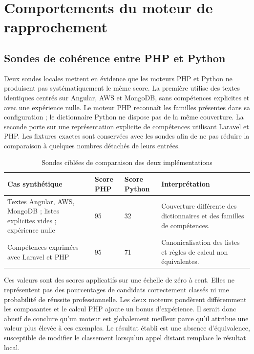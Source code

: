 \section{Comportements du moteur de rapprochement}

\subsection{Sondes de cohérence entre PHP et Python}

Deux sondes locales mettent en évidence que les moteurs PHP et Python ne produisent pas systématiquement le même score. La première utilise des textes identiques centrés sur Angular, AWS et MongoDB, sans compétences explicites et avec une expérience nulle. Le moteur PHP reconnaît les familles présentes dans sa configuration ; le dictionnaire Python ne dispose pas de la même couverture. La seconde porte sur une représentation explicite de compétences utilisant Laravel et PHP. Les fixtures exactes sont conservées avec les sondes afin de ne pas réduire la comparaison à quelques nombres détachés de leurs entrées.

\begin{table}[htbp]
\centering
\small
\caption{Sondes ciblées de comparaison des deux implémentations}
\label{tab:validation-scores}
\begin{tabularx}{\textwidth}{@{}Xp{}P{0.14\textwidth}P{0.25\textwidth}@{}}
\toprule
Cas synthétique & Score PHP & Score Python & Interprétation \\
\midrule
Textes Angular, AWS, MongoDB ; listes explicites vides ; expérience nulle & 95 & 32 & Couverture différente des dictionnaires et des familles de compétences. \\
Compétences exprimées avec Laravel et PHP & 95 & 71 & Canonicalisation des listes et règles de calcul non équivalentes. \\
\bottomrule
\end{tabularx}
\end{table}

Ces valeurs sont des scores applicatifs sur une échelle de zéro à cent. Elles ne représentent pas des pourcentages de candidats correctement classés ni une probabilité de réussite professionnelle. Les deux moteurs pondèrent différemment les composantes et le calcul PHP ajoute un bonus d'expérience. Il serait donc abusif de conclure qu'un moteur est globalement meilleur parce qu'il attribue une valeur plus élevée à ces exemples. Le résultat établi est une absence d'équivalence, susceptible de modifier le classement lorsqu'un appel distant remplace le résultat local.

